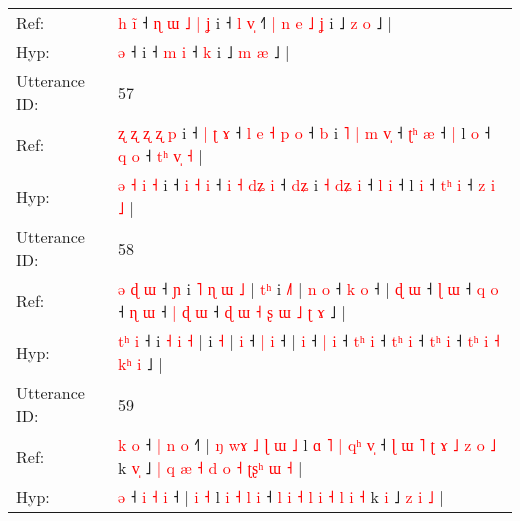 \documentclass[10pt]{article}
\DeclareRobustCommand{\hl}[1]{{\textcolor{red}{#1}}}
\begin{document}
\begin{longtable}{ll}
Ref: & \hl{h}\hl{ }\hl{i}\hl{̃} ˧\hl{ }\hl{ɳ}\hl{ }\hl{ɯ}\hl{ }\hl{˩}\hl{ }\hl{|}\hl{ }\hl{ʝ} i ˧ \hl{l} \hl{v}\hl{̩} ˧\hl{˥}\hl{ }\hl{|}\hl{ }\hl{n}\hl{ }\hl{e}\hl{ }\hl{˩} \hl{ʝ} i ˩ \hl{z} \hl{o} ˩ |
 \\
Hyp: & \hl{}\hl{}\hl{}\hl{ə} ˧\hl{}\hl{}\hl{}\hl{}\hl{}\hl{}\hl{}\hl{}\hl{}\hl{} i ˧ \hl{m} \hl{}\hl{i} ˧\hl{}\hl{}\hl{}\hl{}\hl{}\hl{}\hl{}\hl{}\hl{} \hl{k} i ˩ \hl{m} \hl{æ} ˩ |
 \\
\midrule
Utterance ID: & 57 \\
Ref: & \hl{ʐ}\hl{ }\hl{ʐ} \hl{ʐ} \hl{ʐ} \hl{p} i ˧ \hl{|} \hl{ʈ} \hl{ɤ} ˧ \hl{l} \hl{e} \hl{˧}\hl{ }\hl{p} \hl{o} ˧ \hl{}\hl{b} i \hl{˥} \hl{|}\hl{ }\hl{m} \hl{v}\hl{̩} ˧ \hl{ʈ}\hl{ʰ} \hl{æ} ˧\hl{ }\hl{|} l \hl{o} ˧ \hl{}\hl{q} \hl{o} ˧ \hl{t}\hl{ʰ} \hl{v}\hl{̩} \hl{˧} |
 \\
Hyp: & \hl{}\hl{}\hl{ə} \hl{˧} \hl{i} \hl{˧} i ˧ \hl{i} \hl{˧} \hl{i} ˧ \hl{i} \hl{˧} \hl{}\hl{d}\hl{ʑ} \hl{i} ˧ \hl{d}\hl{ʑ} i \hl{˧} \hl{}\hl{d}\hl{ʑ} \hl{}\hl{i} ˧ \hl{}\hl{l} \hl{i} ˧\hl{}\hl{} l \hl{i} ˧ \hl{t}\hl{ʰ} \hl{i} ˧ \hl{}\hl{z} \hl{}\hl{i} \hl{˩} |
 \\
\midrule
Utterance ID: & 58 \\
Ref: & \hl{ə}\hl{ }\hl{ɖ} \hl{ɯ} ˧\hl{ }\hl{ɲ} i\hl{ }\hl{˥} \hl{ɳ} \hl{ɯ} \hl{˩} |\hl{ }\hl{t}\hl{ʰ} i \hl{˩}\hl{˥} |\hl{ }\hl{n} \hl{o} ˧ \hl{k} \hl{o} ˧ |\hl{ }\hl{ɖ} \hl{ɯ} ˧ \hl{ɭ} \hl{ɯ} ˧ \hl{}\hl{q} \hl{o} ˧ \hl{}\hl{ɳ} \hl{ɯ} ˧ \hl{|}\hl{ }\hl{ɖ} \hl{ɯ} ˧\hl{ }\hl{ɖ} \hl{ɯ}\hl{ }\hl{˧} \hl{ʂ} \hl{ɯ} \hl{˩}\hl{ }\hl{ʈ} \hl{ɤ} ˩ |
 \\
Hyp: & \hl{}\hl{t}\hl{ʰ} \hl{i} ˧\hl{}\hl{} i\hl{}\hl{} \hl{˧} \hl{i} \hl{˧} |\hl{}\hl{}\hl{} i \hl{}\hl{˧} |\hl{}\hl{} \hl{i} ˧ \hl{|} \hl{i} ˧ |\hl{}\hl{} \hl{i} ˧ \hl{|} \hl{i} ˧ \hl{t}\hl{ʰ} \hl{i} ˧ \hl{t}\hl{ʰ} \hl{i} ˧ \hl{}\hl{t}\hl{ʰ} \hl{i} ˧\hl{}\hl{} \hl{}\hl{t}\hl{ʰ} \hl{i} \hl{˧} \hl{}\hl{k}\hl{ʰ} \hl{i} ˩ |
 \\
\midrule
Utterance ID: & 59 \\
Ref: & \hl{k}\hl{ }\hl{o} ˧ \hl{|} \hl{n} \hl{o} ˧\hl{˥} |\hl{ }\hl{ŋ}\hl{ }\hl{w}\hl{ɤ}\hl{ }\hl{˩}\hl{ }\hl{ɭ} \hl{ɯ} \hl{˩} l\hl{ }\hl{ɑ} \hl{˥} \hl{|} \hl{q}\hl{ʰ} \hl{v}\hl{̩} ˧ \hl{ɭ} \hl{ɯ} \hl{˥} \hl{ʈ} \hl{ɤ} \hl{˩} \hl{z} \hl{o} \hl{˩} k \hl{v}\hl{̩} ˩\hl{ }\hl{|}\hl{ }\hl{q}\hl{ }\hl{æ}\hl{ }\hl{˧}\hl{ }\hl{d}\hl{ }\hl{o}\hl{ }\hl{˧} \hl{ʈ}\hl{ʂ}\hl{ʰ} \hl{ɯ} \hl{˧} |
 \\
Hyp: & \hl{}\hl{}\hl{ə} ˧ \hl{i} \hl{˧} \hl{i} ˧\hl{} |\hl{}\hl{}\hl{}\hl{}\hl{}\hl{}\hl{}\hl{}\hl{} \hl{i} \hl{˧} l\hl{}\hl{} \hl{i} \hl{˧} \hl{}\hl{l} \hl{}\hl{i} ˧ \hl{l} \hl{i} \hl{˧} \hl{l} \hl{i} \hl{˧} \hl{l} \hl{i} \hl{˧} k \hl{}\hl{i} ˩\hl{}\hl{}\hl{}\hl{}\hl{}\hl{}\hl{}\hl{}\hl{}\hl{}\hl{}\hl{}\hl{}\hl{} \hl{}\hl{}\hl{z} \hl{i} \hl{˩} |

\end{longtable}
\end{document}
